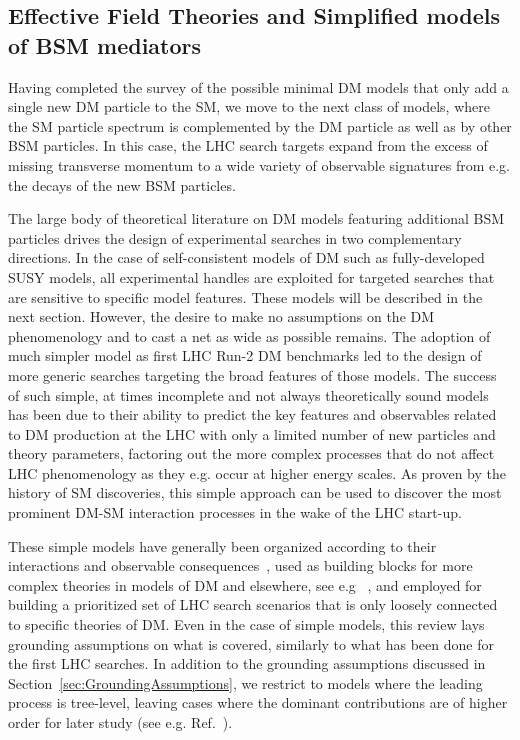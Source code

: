 

\subsection{Effective Field Theories and Simplified models of BSM mediators}
\label{sec:BSMMediatorModels}

Having completed the survey of the possible minimal DM models that only add a single new DM particle to the SM, we move to the next class of models, where the SM particle spectrum is complemented by the DM particle as well as by other BSM particles. In this case, the LHC search targets expand from the excess of missing transverse momentum to a wide variety of observable signatures from e.g. the decays of the new BSM particles. 

The large body of theoretical literature on DM models featuring additional BSM particles drives the design of experimental searches in two complementary directions. In the case of self-consistent models of DM such as fully-developed SUSY models, all experimental handles are exploited for targeted searches that are sensitive to specific model features. These models will be described in the next section. However, the desire to make no assumptions on the DM phenomenology and to cast a net as wide as possible remains. The adoption of much simpler model as first LHC Run-2 DM benchmarks led to the design of more generic searches targeting the broad features of those models. The success of such simple, at times incomplete and not always theoretically sound models has been due to their ability to predict the key features and observables related to DM production at the LHC with only a limited number of new particles and theory parameters, factoring out the more complex processes that do not affect LHC phenomenology as they e.g. occur at higher energy scales. As proven by the history of SM discoveries, this simple approach can be used to discover the most prominent DM-SM interaction processes in the wake of the LHC start-up. 

These simple models have generally been organized according to their interactions and observable consequences~\cite{Goodman:2010ku,Abercrombie:2015wmb}, used as building blocks for more complex theories in models of DM and elsewhere, see e.g ~\cite{Alwall:2008ag, Agrawal:2010fh, Alves:2011wf, Choudhury:2015lha, Gutschow:2012pw}, and employed for building a prioritized set of LHC search scenarios that is only loosely connected to specific theories of DM. 
Even in the case of simple models, this review lays grounding assumptions on what is covered, similarly to what has been done for the first LHC searches. In addition to the grounding assumptions discussed in Section~\ref{sec:GroundingAssumptions}, we restrict to models where the leading process is tree-level, leaving cases where the dominant contributions are of higher order for later study (see e.g. Ref.~\cite{Godbole:2015gma}). 

